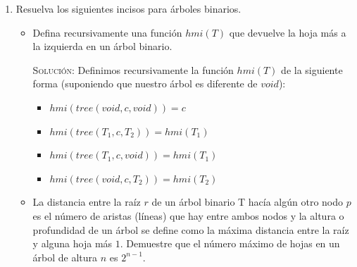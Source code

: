 \documentclass[letterpaper,11pt]{article}
\begin{document}
\begin{enumerate}
\begin{itemize}
\begin{proof}
\begin{itemize}
                \item Hipótesis de inducción. Supongamos que $¬A ≡ A_{D}$ y 
                $¬B ≡ B_{D}$.

                \item Paso inductivo. \\ 
                Tenemos que 
                \begin{itemize}
                    \item $A = ¬A ⇒ dual(¬A) = ¬dual(A) ≡ ¬¬A$ 
                    \item $A = A \land B ⇒ dual(A \land B) = 
                    dual(A) \lor dual(B) ≡ ¬A \lor ¬B ≡ ¬(A \land B)$
                    \item $A = A \lor B ⇒ dual(A \lor B) = 
                    dual(A) \land dual(B) ≡ ¬A \land ¬B ≡ ¬(A \lor B)$
                \end{itemize}
            \end{itemize}
        \end{proof}
    \end{itemize}

    \item Resuelva los siguientes incisos para árboles binarios.
    \begin{itemize}
        \item Defina recursivamente una función $hmi(T)$ que devuelve la hoja
        más a la izquierda en un árbol binario.

        \textsc{Solución:} Definimos recursivamente la función $hmi(T)$ de la 
        siguiente forma (suponiendo que nuestro árbol es diferente de $void$):
        \begin{itemize}
            \item $hmi(tree(void, c, void)) = c$
            \item $hmi(tree(T_{1}, c, T_{2})) = hmi(T_{{1}})$
            \item $hmi(tree(T_{1}, c, void)) = hmi(T_{{1}})$
            \item $hmi(tree(void, c, T_{2})) = hmi(T_{2})$
        \end{itemize}

        \item La distancia entre la raíz $r$ de un árbol binario T hacía algún
        otro nodo $p$ es el número de aristas (líneas) que hay entre ambos nodos
        y la altura o profundidad de un árbol se define como la máxima distancia
        entre la raíz y alguna hoja más $1$. Demuestre que el número máximo de 
        hojas en un árbol de altura $n$ es $2^{n - 1}$.


\end{itemize}
\end{enumerate}
\end{document}
